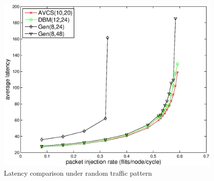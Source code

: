 \documentclass[paper]{ieice}
\begin{document}
\begin{figure}[h]
  \centering
  \includegraphics[scale=0.4]{figures/randomlat.eps}
  \caption{Latency comparison under random traffic pattern}\label{randomlat}
\end{figure}
\end{document}
